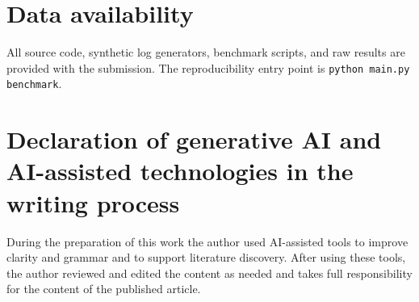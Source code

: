 \documentclass[preprint,12pt]{elsarticle}
\begin{document}
\section*{Data availability}
All source code, synthetic log generators, benchmark scripts, and raw results are provided with the submission.
The reproducibility entry point is \texttt{python main.py benchmark}.

\section*{Declaration of generative AI and AI-assisted technologies in the writing process}
During the preparation of this work the author used AI-assisted tools to improve clarity and grammar and to support literature discovery. After using these tools, the author reviewed and edited the content as needed and takes full responsibility for the content of the published article.



\end{document}
